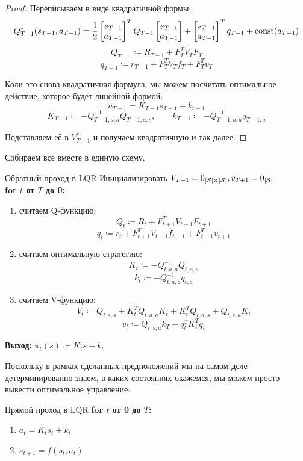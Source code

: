 \begin{theorem}
\begin{proof}
Переписываем в виде квадратичной формы:
$$Q^*_{T-1}(s_{T-1}, a_{T-1}) = \frac{1}{2} \begin{bmatrix} s_{T-1} \\ a_{T-1} \end{bmatrix}^T Q_{T-1} \begin{bmatrix} s_{T-1} \\ a_{T-1} \end{bmatrix} + \begin{bmatrix} s_{T-1} \\ a_{T-1} \end{bmatrix}^T q_{T-1} + \operatorname{const}(a_{T-1})$$
$$Q_{T-1} \coloneqq R_{T-1} + F_T^TV_TF_T$$
$$q_{T-1} \coloneqq r_{T-1} + F_T^T V_T f_T + F_T^T v_T$$

Коли это снова квадратичная формула, мы можем посчитать оптимальное действие, которое будет линейной формой:
$$a_{T-1} = K_{T-1}s_{T-1} + k_{t-1}$$
$$K_{T-1} \coloneqq -Q_{T-1, a, a}^{-1} Q_{T-1, a, s}, \qquad k_{T-1} \coloneqq -Q^{-1}_{T-1, a, a} q_{T-1,a}$$

Подставляем её в $V^*_{T-1}$ и получаем квадратичную и так далее.
\end{proof}
\end{theorem}

Собираем всё вместе в единую схему.

\begin{algorithm}{Обратный проход в LQR}
Инициализировать $V_{T+1} = 0_{|\mathcal{S}| \times |\mathcal{S}|}, v_{T+1} = 0_{|\mathcal{S}|}$ \\
\textbf{for $t$ от $T$ до 0:}
\begin{enumerate}
    \item считаем Q-функцию:
    $$Q_t \coloneqq R_t + F_{t+1}^TV_{t+1}F_{t+1}$$
    $$q_t \coloneqq r_t + F_{t+1}^TV_{t+1}f_{t+1} + F_{t+1}^T v_{t+1}$$
    \item считаем оптимальную стратегию:
    $$K_t \coloneqq -Q_{t, a, a}^{-1} Q_{t, a, s}$$
    $$k_t \coloneqq -Q^{-1}_{t, a, a} q_{t,a}$$
    \item считаем V-функцию:
    $$V_t \coloneqq Q_{t, s, s} + K_t^TQ_{t, a, a}K_t + K_t^TQ_{t, a, s} + Q_{t, s, a}K_t$$
    $$v_t \coloneqq Q_{t, s, a}k_T + q_t^T K_t^T q_t$$
\end{enumerate}

\vspace{0.3cm}
\textbf{Выход:} $\pi_t(s) \coloneqq K_ts + k_t$
\end{algorithm}

Поскольку в рамках сделанных предположений мы на самом деле детерминированно знаем, в каких состояниях окажемся, мы можем просто вывести оптимальное управление:
\begin{algorithm}{Прямой проход в LQR}
\textbf{for $t$ от 0 до $T$:}
\begin{enumerate}
    \item $a_t = K_t s_t + k_t$
    \item $s_{t+1} = f(s_t, a_t)$
\end{enumerate}
\end{algorithm}


